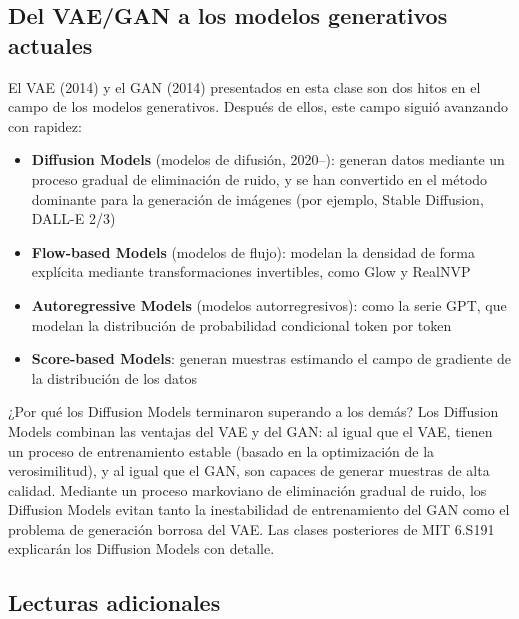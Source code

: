 \subsection{Del VAE/GAN a los modelos generativos actuales}

El VAE (2014) y el GAN (2014) presentados en esta clase son dos hitos en el campo de los modelos generativos. Después de ellos, este campo siguió avanzando con rapidez:

\begin{itemize}
    \item \textbf{Diffusion Models} (modelos de difusión, 2020--): generan datos mediante un proceso gradual de eliminación de ruido, y se han convertido en el método dominante para la generación de imágenes (por ejemplo, Stable Diffusion, DALL-E 2/3)
    \item \textbf{Flow-based Models} (modelos de flujo): modelan la densidad de forma explícita mediante transformaciones invertibles, como Glow y RealNVP
    \item \textbf{Autoregressive Models} (modelos autorregresivos): como la serie GPT, que modelan la distribución de probabilidad condicional token por token
    \item \textbf{Score-based Models}: generan muestras estimando el campo de gradiente de la distribución de los datos
\end{itemize}

\begin{knowledgebox}{¿Por qué los Diffusion Models terminaron superando a los demás?}
Los Diffusion Models combinan las ventajas del VAE y del GAN: al igual que el VAE, tienen un proceso de entrenamiento estable (basado en la optimización de la verosimilitud), y al igual que el GAN, son capaces de generar muestras de alta calidad. Mediante un proceso markoviano de eliminación gradual de ruido, los Diffusion Models evitan tanto la inestabilidad de entrenamiento del GAN como el problema de generación borrosa del VAE. Las clases posteriores de MIT 6.S191 explicarán los Diffusion Models con detalle.
\end{knowledgebox}

\subsection{Lecturas adicionales}

